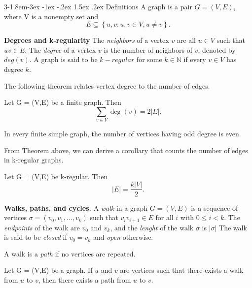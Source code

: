 \documentclass{tufte-handout}
\makeatletter
\renewcommand{\subsection}{\@startsection{subsection}%
    {3}{-1.8em}{-3ex \@plus -1ex \@minus -.2ex}%
    {1.5ex \@plus .2ex}
    {\hspace*{-5.5em}\fcolorbox{ltblue}{ltblue}{\parbox[c][1.0ex][b]{4em}{\phantom{space}}}
    \normalfont\large\itshape\color{ltblue}}}
\makeatother
\begin{document}
\subsection{Definitions}
A graph is a pair $ G = (V,E) $, where V is a nonempty set and \[E \subseteq \left\{ {u,v}: u,v \in V, u \neq v\right\}.\]


\textbf{Degrees and k-regularity}
The \textit{neighbors} of a vertex \( v \) are all \( u \in V \) such that \( uv \in E \). The 
\textit{degree} of a vertex \( v \) is the number of neighbors of \( v \), denoted by \( deg(v) \).
A graph is said to be \( k-regular \) for some \( k\in \mathbb{N} \) if every \( v \in V \) has degree \( k \).

The following theorem relates vertex degree to the number of edges.
\begin{Theorem}
    Let G = (V,E) be a finite graph. Then \[\sum_{v \in V} \deg(v) = 2 \left|E\right|.\]
\end{Theorem}

\begin{Corollary}
    In every finite simple graph, the number of vertices having odd degree is even.
\end{Corollary}

From Theorem above, we can derive a corollary that counts the number of edges in k-regular graphs.

\begin{Corollary}
    Let G = (V,E) be k-regular. Then \[\left|E\right| = \frac{k\left|V\right|}{2}.\]
\end{Corollary}

\textbf{Walks, paths, and cycles.} A \textit{walk} in a graph \( G = (V,E) \)
is a sequence of vertices \( \sigma = (v_0, v_1, \ldots, v_k) \) such that \( v_i v_{i+1} \in E \) for all \( i \) with \( 0 \leq i < k \). 
The \textit{endpoints} of the walk are \( v_0 \) and \( v_k \), and the \textit{lenght} of the walk \( \sigma \) is \( \left|\sigma\right| \)
The walk is said to be \textit{closed} if \( v_0 = v_k \) and \textit{open} otherwise. 

A walk is a \textit{path} if no vertices are repeated. 
\begin{Theorem}
    Let G = (V,E) be a graph. If \( u \) and \( v \) are 
    vertices such that there exists a walk from \( u \) to \( v \), then there exists a path from \( u \) to \( v \).
\end{Theorem}
\end{document}
